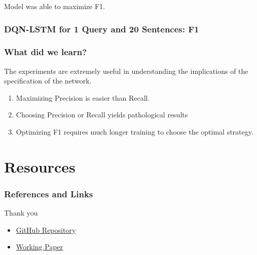 \documentclass[]{beamer}
\begin{document}
		\begin{frame}
			Model was able to maximize F1.
			\frametitle{DQN-LSTM for 1 Query and 20 Sentences: F1}
			\begin{center}
			\end{center}
		\end{frame}

		\begin{frame}
			\frametitle{What did we learn?}
			The experiments are extremely useful in understanding the implications of the specification of the network.
			\begin{center}
				\begin{enumerate}
					\item<2-> Maximizing Precision is easier than Recall.
					\item<2-> Choosing Precision or Recall yields pathological results
					\item<2-> Optimizing F1 requires much longer training to choose the optimal strategy.
				\end{enumerate}
			\end{center}
		\end{frame}


\section{Resources}
\begin{frame}
	\frametitle{References and Links}
	Thank you
	\begin{itemize}
	\item<1-> \color{blue} \href{https://github.com/franciscojavierarceo/DQN-Event-Summarization}{GitHub Repository}
	\item<1-> \color{blue} \href{https://github.com/franciscojavierarceo/DQN-Event-Summarization/blob/master/Paper/DeepNLPQLearning.pdf}{Working Paper}
	\end{itemize}
\end{frame}


\end{document}
